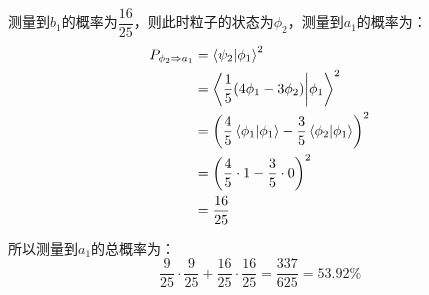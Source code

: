 \documentclass[a4paper,fontset=none]{ctexart}
\begin{document}
\begin{itemize}
        测量到$b_1$的概率为$\dfrac{16}{25}$，则此时粒子的状态为$\phi_2$，测量到$a_1$的概率为：
        \begin{align*}
            P_{\phi_2 \Rightarrow a_1}
            &= \bra{\psi_2}\ket{\phi_1}^2 \\
            &= \bra{\frac{1}{5}(4\phi_1 - 3\phi_2)}\ket{\phi_1}^2 \\
            &= \left(\frac{4}{5} \bra{\phi_1}\ket{\phi_1} - \frac{3}{5} \bra{\phi_2}\ket{\phi_1}\right)^2 \\
            &= \left(\frac{4}{5} \cdot 1 - \frac{3}{5} \cdot 0\right)^2 \\
            &= \frac{16}{25}
        \end{align*}

        所以测量到$a_1$的总概率为：
        \[
            \frac{9}{25} \cdot \frac{9}{25} + \frac{16}{25} \cdot \frac{16}{25} = \frac{337}{625} = 53.92\%
        \]


\end{itemize}
\end{document}

